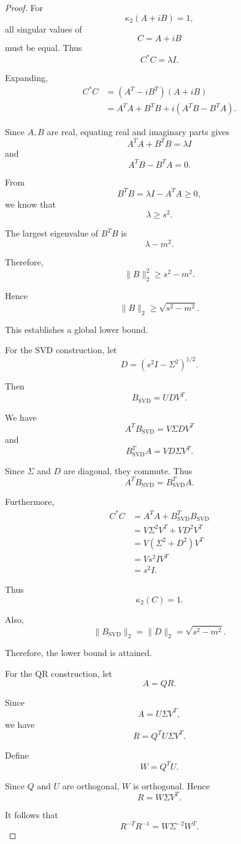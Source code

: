\documentclass[11pt, reqno, a4paper]{amsart}
\theoremstyle{plain}
\theoremstyle{definition}
\theoremstyle{remark}
\numberwithin{equation}{section}
\begin{document}
\begin{proof}
For
\[
\kappa_2(A+iB)=1,
\]
all singular values of
\[
C=A+iB
\]
must be equal. Thus
\[
C^*C=\lambda I.
\]

Expanding,
\begin{align*}
C^*C
&=(A^T-iB^T)(A+iB)\\
&=A^TA+B^TB+i(A^TB-B^TA).
\end{align*}

Since $A,B$ are real, equating real and imaginary parts gives
\[
A^TA+B^TB=\lambda I
\]
and
\[
A^TB-B^TA=0.
\]

From
\[
B^TB=\lambda I-A^TA\geq0,
\]
we know that
\[
\lambda\geq s^2.
\]

The largest eigenvalue of $B^TB$ is
\[
\lambda-m^2.
\]

Therefore,
\[
\|B\|_2^2
\geq
s^2-m^2.
\]

Hence
\[
\boxed{
\|B\|_2\geq\sqrt{s^2-m^2}.
}
\]

This establishes a global lower bound.

For the SVD construction, let
\[
D=(s^2I-\Sigma^2)^{1/2}.
\]

Then
\[
B_{\mathrm{SVD}}=UDV^T.
\]

We have
\[
A^TB_{\mathrm{SVD}}
=
V\Sigma D V^T
\]
and
\[
B_{\mathrm{SVD}}^TA
=
V D\Sigma V^T.
\]

Since $\Sigma$ and $D$ are diagonal, they commute. Thus
\[
A^TB_{\mathrm{SVD}}
=
B_{\mathrm{SVD}}^TA.
\]

Furthermore,
\begin{align*}
C^*C
&=A^TA+B_{\mathrm{SVD}}^TB_{\mathrm{SVD}}\\
&=V\Sigma^2V^T+VD^2V^T\\
&=V(\Sigma^2+D^2)V^T\\
&=Vs^2IV^T\\
&=s^2I.
\end{align*}

Thus
\[
\kappa_2(C)=1.
\]

Also,
\[
\|B_{\mathrm{SVD}}\|_2
=
\|D\|_2
=
\sqrt{s^2-m^2}.
\]

Therefore, the lower bound is attained.

For the QR construction, let
\[
A=QR.
\]

Since
\[
A=U\Sigma V^T,
\]
we have
\[
R=Q^TU\Sigma V^T.
\]

Define
\[
W=Q^TU.
\]

Since $Q$ and $U$ are orthogonal, $W$ is orthogonal. Hence
\[
R=W\Sigma V^T.
\]

It follows that
\[
R^{-T}R^{-1}
=
W\Sigma^{-2}W^T.
\]


\end{proof}
\end{document}
